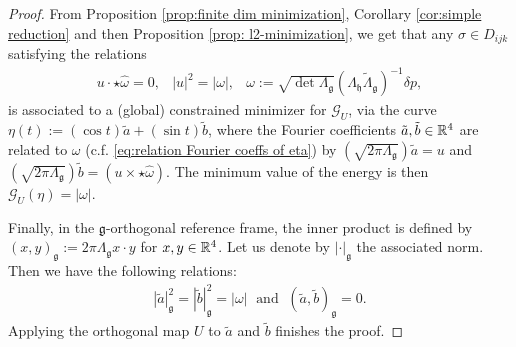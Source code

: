 \begin{proof}
From Proposition \ref{prop:finite dim minimization}, Corollary \ref{cor:simple reduction} and then Proposition \ref{prop: l2-minimization}, we get that any $\sigma \in D_{ijk}$ satisfying the relations
\begin{eqnarray}
 u \cdot \star \hat{\omega} = 0, & |u|^2 = |\omega|, & \omega := \sqrt{\det \Lambda_{\mathfrak{g}}} (\Lambda_{\mathfrak{h}} \tilde{\Lambda}_{\mathfrak{g}})^{-1} \delta p,
\end{eqnarray}
is associated to a (global) constrained minimizer for $\mathcal{G}_{U}$, via the curve $\eta(t) := (\cos t) \tilde{a} + (\sin t) \tilde{b}$, where the Fourier coefficients $\tilde{a}, \tilde{b} \in \mathbb{R}^4$ are related to $\omega$ (c.f. \ref{eq:relation Fourier coeffs of eta}) by $(\sqrt{2 \pi \Lambda_{\mathfrak{g}}}) \tilde{a} = u$ and $(\sqrt{2 \pi \Lambda_{\mathfrak{g}}}) \tilde{b} = (u \times \star\hat{\omega})$. The minimum value of the energy is then $\mathcal{G}_{U}(\eta) = |\omega|$.

Finally, in the $\mathfrak{g}$-orthogonal reference frame, the inner product is defined by $(x, y)_{\mathfrak{g}} := 2 \pi \Lambda_{\mathfrak{g}}x \cdot y$ for $x,y \in \mathbb{R}^4$. Let us denote by $|\cdot|_{\mathfrak{g}}$ the associated norm. Then we have the following relations:
\begin{align}
|\tilde{a}|_{\mathfrak{g}}^2 = |\tilde{b}|_{\mathfrak{g}}^{2} = |\omega| \;  \text{ and } \; (\tilde{a}, \tilde{b})_{\mathfrak{g}} = 0.
\end{align}
Applying the orthogonal map $U$ to $\tilde{a}$ and $\tilde{b}$ finishes the proof.
\end{proof}



